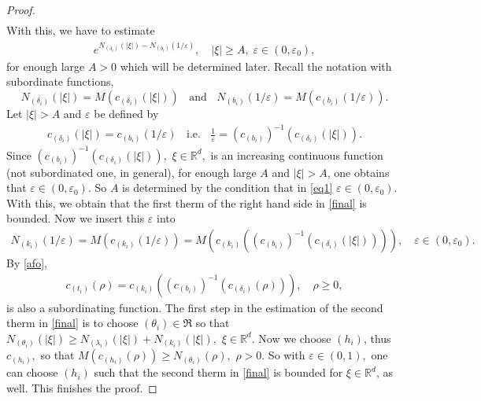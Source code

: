 \documentclass[sn-mathphys,Numbered]{sn-jnl}%
\theoremstyle{thmstyleone}%
\theoremstyle{thmstyletwo}%
\theoremstyle{thmstylethree}%
\begin{document}
\begin{proof}
\begin{align*}
\end{align*}
With this, we have to estimate
\begin{align*}
e^{N_{(\delta_i)}(|\xi|)-N_{(b_i)}(1/\varepsilon)},\quad |\xi|\geq A, \;\varepsilon\in(0,\varepsilon_0),
\end{align*}
for enough large $A>0$ which will be determined later.
Recall the notation with  subordinate functions,%
\begin{equation*}%
N_{(\delta_i)}(|\xi|)=M(c_{(\delta_i)}(|\xi|)) \;\; \mbox{ and }\;\; N_{(b_i)}(1/\varepsilon)= M(c_{(b_i)}(1/\varepsilon)).
\end{equation*}
Let $|\xi|>A$ and $\varepsilon$ be defined by
\begin{align}\label{eq1}
c_{(\delta_i)}(|\xi|)=c_{(b_i)}(1/\varepsilon)\; \;\mbox{ i.e.  } \; \; \frac{1}{\varepsilon} =(c_{(b_i)})^{-1}(c_{(\delta_i)}(|\xi|)).
\end{align}
Since $(c_{(b_i)})^{-1}(c_{(\delta_i)}(|\xi|)), $ $\xi\in \mathbb{R}^d,$ is an increasing continuous function (not subordinated one, in general), for enough large $A$  and $|\xi|>A$, one obtains that $\varepsilon\in(0,\varepsilon_0).$ So $A$ is determined by the condition that in \eqref{eq1} $\varepsilon\in (0,\varepsilon_0).$ With this, we obtain that the first therm of the right hand side in \eqref{final} is bounded.  Now we insert this $\varepsilon$ into 
\begin{align*}
N_{(k_i)}(1/\varepsilon)=M(c_{(k_i)}(1/\varepsilon))=M(c_{(k_i)}((c_{(b_i)})^{-1}(c_{(\delta_i)}(|\xi|)))), \quad \varepsilon\in(0,\varepsilon_0).
\end{align*}
By \eqref{afo},%
\begin{align*}
c_{(t_i)}(\rho)=c_{(k_i)}((c_{(b_i)})^{-1}(c_{(\delta_i)}(\rho))),\quad \rho\geq 0,
\end{align*}
is also a  subordinating function.
The first step in the estimation of the second therm in \eqref{final} is to choose $(\theta_i)\in\mathfrak R$ so that $N_{(\theta_i)}(|\xi|)\geq N_{(\lambda_i)}(|\xi|)+N_{(k_i)}(|\xi|), $ $\xi\in\mathbb{R}^d.$ Now we choose $(h_i)$, thus $c_{(h_i)},$  so that $M(c_{(h_i)}(\rho))\geq N_{(\theta_i)}(\rho),$ $ \rho>0$. So with  $\varepsilon\in(0,1),$ one can choose $(h_i)$ such that the second therm in \eqref{final} is bounded for $\xi\in\mathbb{R}^d$, as well. This  finishes the proof.
\end{proof}
\end{document}
